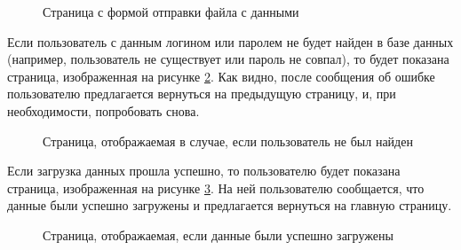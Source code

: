\documentclass[a4paper, 14pt]{extarticle}
\begin{document}
\begin{figure}[H]
  \centering
  \caption{Страница с формой отправки файла с данными}
  \label{fig:index.png}
\end{figure}

Если пользователь с данным логином или паролем не будет найден в базе данных
(например, пользователь не существует или пароль не совпал), то будет показана
страница, изображенная на рисунке \ref{fig:user-not-found.png}. Как видно, после
сообщения об ошибке пользователю предлагается вернуться на предыдущую страницу,
и, при необходимости, попробовать снова.

\begin{figure}[H]
  \centering
  \caption{Страница, отображаемая в случае, если пользователь не был найден}
  \label{fig:user-not-found.png}
\end{figure}

Если загрузка данных прошла успешно, то пользователю будет показана страница,
изображенная на рисунке \ref{fig:form-success.png}. На ней пользователю
сообщается, что данные были успешно загружены и предлагается вернуться на
главную страницу.

\begin{figure}[H]
  \centering
  \caption{Страница, отображаемая, если данные были успешно загружены}
  \label{fig:form-success.png}
\end{figure}
\end{document}
